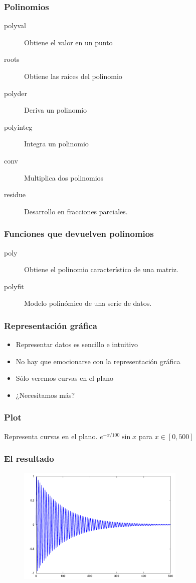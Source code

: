 \documentclass[12pt]{beamer}
\begin{document}
\begin{large}
\begin{frame}
\frametitle{Polinomios}
\begin{description}
\item[polyval] Obtiene el valor en un punto
\item[roots] Obtiene las raíces del polinomio
\item[polyder] Deriva un polinomio
\item[polyinteg] Integra un polinomio
\item[conv] Multiplica dos polinomios
\item[residue] Desarrollo en fracciones parciales.
\end{description}
\end{frame}

\begin{frame}
\frametitle{Funciones que devuelven polinomios}
\begin{description}
\item[poly] Obtiene el polinomio característico de una matriz.
\item[polyfit] Modelo polinómico de una serie de datos.
\end{description}
\end{frame}

\begin{frame}
\frametitle{Representación gráfica}
\begin{itemize}
\item Representar datos es sencillo e intuitivo
\item No hay que emocionarse con la representación gráfica
\item Sólo veremos curvas en el plano
\item ¿Necesitamos más?
\end{itemize}
\end{frame}


\begin{frame}
\frametitle{Plot}
Representa curvas en el plano. $e^{-x/100}\sin x$ para $x\in[0,500]$
\testcode
\end{frame}

\begin{frame}
\frametitle{El resultado}
  \begin{figure}[h]
    \centering{}
    \includegraphics[width=8cm, keepaspectratio]{fig/abanico.pdf}
  \end{figure}
\end{frame}


\end{large}
\end{document}
